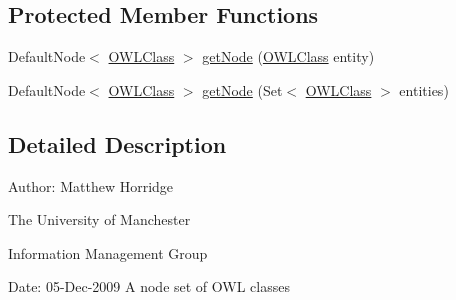\subsection*{Protected Member Functions}
\begin{DoxyCompactItemize}
\item 
Default\-Node$<$ \hyperlink{interfaceorg_1_1semanticweb_1_1owlapi_1_1model_1_1_o_w_l_class}{O\-W\-L\-Class} $>$ \hyperlink{classorg_1_1semanticweb_1_1owlapi_1_1reasoner_1_1impl_1_1_o_w_l_class_node_set_af7bd1c61ebf64ac21adfedddbec38e57}{get\-Node} (\hyperlink{interfaceorg_1_1semanticweb_1_1owlapi_1_1model_1_1_o_w_l_class}{O\-W\-L\-Class} entity)
\item 
Default\-Node$<$ \hyperlink{interfaceorg_1_1semanticweb_1_1owlapi_1_1model_1_1_o_w_l_class}{O\-W\-L\-Class} $>$ \hyperlink{classorg_1_1semanticweb_1_1owlapi_1_1reasoner_1_1impl_1_1_o_w_l_class_node_set_a114aa4b7a9036ac0d7010975d756e5b8}{get\-Node} (Set$<$ \hyperlink{interfaceorg_1_1semanticweb_1_1owlapi_1_1model_1_1_o_w_l_class}{O\-W\-L\-Class} $>$ entities)
\end{DoxyCompactItemize}


\subsection{Detailed Description}
Author\-: Matthew Horridge\par
 The University of Manchester\par
 Information Management Group\par
 Date\-: 05-\/\-Dec-\/2009 A node set of O\-W\-L classes 

